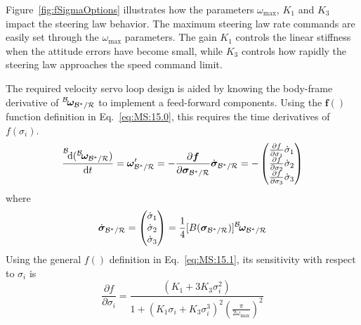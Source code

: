\documentclass[]{AVSSimReportMemo}
\begin{document}
Figure~\ref{fig:fSigmaOptions} illustrates how the parameters $\omega_{\text{max}}$, $K_{1}$ and $K_{3}$ impact the steering law behavior.  The maximum steering law rate commands are easily set through the $\omega_{\text{max}}$ parameters.  The gain $K_{1}$ controls the linear stiffness when the attitude errors have become small, while $K_{3}$ controls how rapidly the steering law approaches the speed command limit.

The required velocity servo loop design is aided by knowing the body-frame derivative of $\leftexp{B}{\bm\omega}_{{\mathcal{B}}^{\ast}/\mathcal{R}}$ to implement a feed-forward components.  Using the $\bm f()$ function definition in Eq.~\eqref{eq:MS:15.0}, this requires the time derivatives of $f(\sigma_{i})$.  
\begin{equation}
	\frac{\leftexp{B}{\D (\leftexp{B}{\bm\omega}_{{\mathcal{B}}^{\ast}/\mathcal{R}} ) }}{\D t} =
	{\bm\omega}_{{\mathcal{B}}^{\ast}/\mathcal{R}} '
	= - \frac{\partial \bm f}{\partial \bm \sigma_{{\mathcal{B}}^{\ast}/\mathcal{R}}} \dot{\bm \sigma}_{{\mathcal{B}}^{\ast}/\mathcal{R}}
	= - \begin{pmatrix}
		\frac{\partial  f}{\partial  \sigma_{1}} \dot{ \sigma}_{1} \\
		\frac{\partial  f}{\partial  \sigma_{2}} \dot{ \sigma}_{2} \\
		\frac{\partial  f}{\partial  \sigma_{3}} \dot{ \sigma}_{3} 
	\end{pmatrix}
\end{equation}
where
\begin{equation}
	\dot{\bm\sigma}	_{{\mathcal{B}}^{\ast}/\mathcal{R}} = 
	\begin{pmatrix}
		\dot\sigma_{1}\\
		\dot\sigma_{2}\\
		\dot\sigma_{3}
	\end{pmatrix} = 
	 \frac{1}{4}[B(\bm\sigma_{{\mathcal{B}}^{\ast}/\mathcal{R}})] 
	\leftexp{B}{\bm\omega}_{{\mathcal{B}}^{\ast}/\mathcal{R}}
\end{equation}
Using the general $f()$ definition in Eq.~\eqref{eq:MS:15.1}, its sensitivity with respect to $\sigma_{i}$ is
\begin{equation}
	\frac{
		\partial f
	}{
		\partial \sigma_{i}
	} = 
	\frac{
	(K_{1}  + 3 K_{3} \sigma_{i}^{2})
	}{
	1+(K_{1}\sigma_{i} + K_{3} \sigma_{i}^{3})^{2} \left(\frac{\pi}{2 \omega_{\text{max}}}\right)^{2}
	}
\end{equation}
\end{document}
